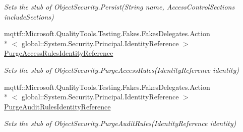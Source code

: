 \begin{DoxyCompactItemize}
\begin{DoxyCompactList}\small\item\em Sets the stub of Object\-Security.\-Persist(\-String name, Access\-Control\-Sections include\-Sections)\end{DoxyCompactList}\item 
mqttf\-::\-Microsoft.\-Quality\-Tools.\-Testing.\-Fakes.\-Fakes\-Delegates.\-Action\\*
$<$ global\-::\-System.\-Security.\-Principal.\-Identity\-Reference $>$ \hyperlink{class_system_1_1_security_1_1_access_control_1_1_fakes_1_1_stub_object_security_a309680f8c5f5f6532b3e854e9a1846b4}{Purge\-Access\-Rules\-Identity\-Reference}
\begin{DoxyCompactList}\small\item\em Sets the stub of Object\-Security.\-Purge\-Access\-Rules(\-Identity\-Reference identity)\end{DoxyCompactList}\item 
mqttf\-::\-Microsoft.\-Quality\-Tools.\-Testing.\-Fakes.\-Fakes\-Delegates.\-Action\\*
$<$ global\-::\-System.\-Security.\-Principal.\-Identity\-Reference $>$ \hyperlink{class_system_1_1_security_1_1_access_control_1_1_fakes_1_1_stub_object_security_ad7d3e305597b7e952bee365be0b785fc}{Purge\-Audit\-Rules\-Identity\-Reference}
\begin{DoxyCompactList}\small\item\em Sets the stub of Object\-Security.\-Purge\-Audit\-Rules(\-Identity\-Reference identity)\end{DoxyCompactList}\end{DoxyCompactItemize}
